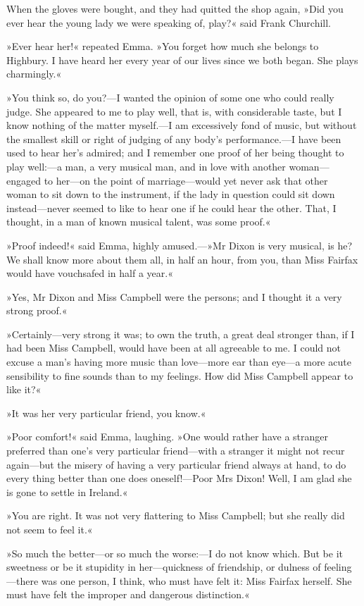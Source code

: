 When the gloves were bought, and they had quitted the shop again, »Did you ever hear the young lady we were speaking of, play?« said Frank Churchill.

»Ever hear her!« repeated Emma. »You forget how much she belongs to Highbury. I have heard her every year of our lives since we both began. She plays charmingly.«

»You think so, do you?—I wanted the opinion of some one who could really judge. She appeared to me to play well, that is, with considerable taste, but I know nothing of the matter myself.—I am excessively fond of music, but without the smallest skill or right of judging of any body's performance.—I have been used to hear her's admired; and I remember one proof of her being thought to play well:—a man, a very musical man, and in love with another woman—engaged to her—on the point of marriage—would yet never ask that other woman to sit down to the instrument, if the lady in question could sit down instead—never seemed to like to hear one if he could hear the other. That, I thought, in a man of known musical talent, was some proof.«

»Proof indeed!« said Emma, highly amused.—»Mr Dixon is very musical, is he? We shall know more about them all, in half an hour, from you, than Miss Fairfax would have vouchsafed in half a year.«

»Yes, Mr Dixon and Miss Campbell were the persons; and I thought it a very strong proof.«

»Certainly—very strong it was; to own the truth, a great deal stronger than, if I had been Miss Campbell, would have been at all agreeable to me. I could not excuse a man's having more music than love—more ear than eye—a more acute sensibility to fine sounds than to my feelings. How did Miss Campbell appear to like it?«

»It was her very particular friend, you know.«

»Poor comfort!« said Emma, laughing. »One would rather have a stranger preferred than one's very particular friend—with a stranger it might not recur again—but the misery of having a very particular friend always at hand, to do every thing better than one does oneself!—Poor Mrs Dixon! Well, I am glad she is gone to settle in Ireland.«

»You are right. It was not very flattering to Miss Campbell; but she really did not seem to feel it.«

»So much the better—or so much the worse:—I do not know which. But be it sweetness or be it stupidity in her—quickness of friendship, or dulness of feeling—there was one person, I think, who must have felt it: Miss Fairfax herself. She must have felt the improper and dangerous distinction.«

